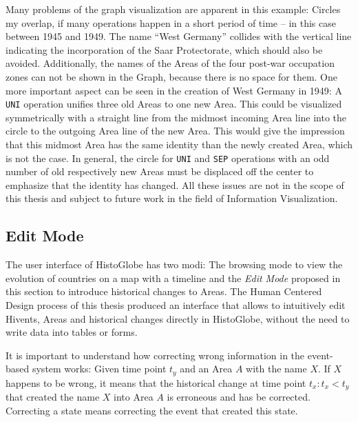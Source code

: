 Many problems of the graph visualization are apparent in this example: Circles my overlap, if many operations happen in a short period of time -- in this case between 1945 and 1949.
The name ``West Germany'' collides with the vertical line indicating the incorporation of the Saar Protectorate, which should also be avoided.
Additionally, the names of the Areas of the four post-war occupation zones can not be shown in the Graph, because there is no space for them.
One more important aspect can be seen in the creation of West Germany in 1949: A \texttt{UNI} operation unifies three old Areas to one new Area. This could be visualized symmetrically with a straight line from the midmost incoming Area line into the circle to the outgoing Area line of the new Area. This would give the impression that this midmost Area has the same identity than the newly created Area, which is not the case. In general, the circle for \texttt{UNI} and \texttt{SEP} operations with an odd number of old respectively new Areas must be displaced off the center to emphasize that the identity has changed.
All these issues are not in the scope of this thesis and subject to future work in the field of Information Visualization.


\subsection{Edit Mode} %
\label{sub:edit_mode}

The user interface of HistoGlobe has two modi: The browsing mode to view the evolution of countries on a map with a timeline and the \emph{Edit Mode} proposed in this section to introduce historical changes to Areas. The Human Centered Design process of this thesis produced an interface that allows to intuitively edit Hivents, Areas and historical changes directly in HistoGlobe, without the need to write data into tables or forms.

It is important to understand how correcting wrong information in the event-based system works: Given time point $t_y$ and an Area $A$ with the name $X$. If $X$ happens to be wrong, it means that the historical change at time point $t_x: t_x < t_y$ that created the name $X$ into Area $A$ is erroneous and has be corrected. Correcting a state means correcting the event that created this state.

